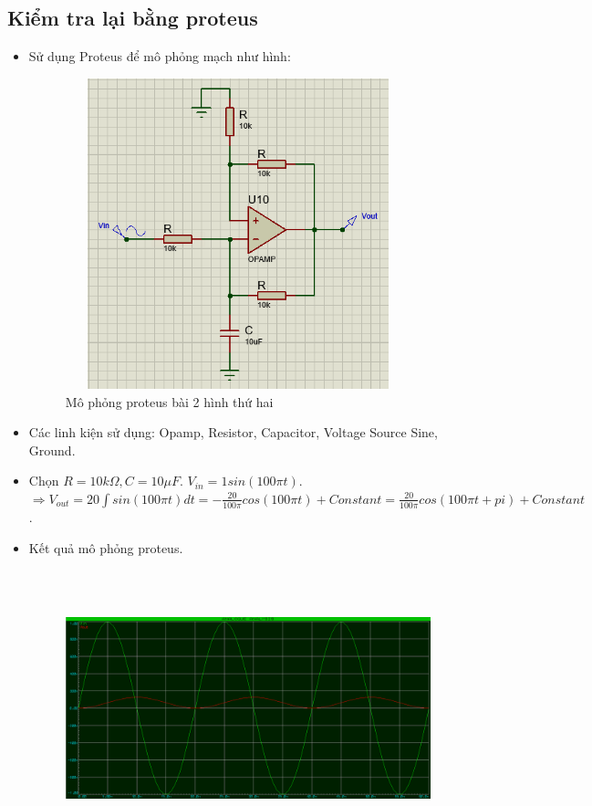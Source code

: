         \subsection{Kiểm tra lại bằng proteus}
            \begin{itemize}
                \item Sử dụng Proteus để mô phỏng mạch như hình: 
                \begin{figure}[H]
                    \centering
                    \includegraphics[width=100mm, height=90mm]{pictures/result2_b_1.png}
                    \caption{Mô phỏng proteus bài 2 hình thứ hai}					
                \end{figure}
                \item Các linh kiện sử dụng: Opamp, Resistor, Capacitor, Voltage Source Sine, Ground.
                \item Chọn $R = 10k\Omega, C = 10\mu F$. $V_{in} = 1sin(100\pi t)$. \\
                $\Rightarrow V_{out} = 20\int sin(100\pi t) dt = -\frac{20}{100\pi}cos(100\pi t) + Constant = \frac{20}{100\pi}cos(100\pi t+ pi) + Constant$.
                \item Kết quả mô phỏng proteus.
                \begin{figure}[H]
                    \centering
                    \includegraphics[width=110mm, height=80mm]{pictures/result2_b_2.png}

\end{figure}
\end{itemize}
